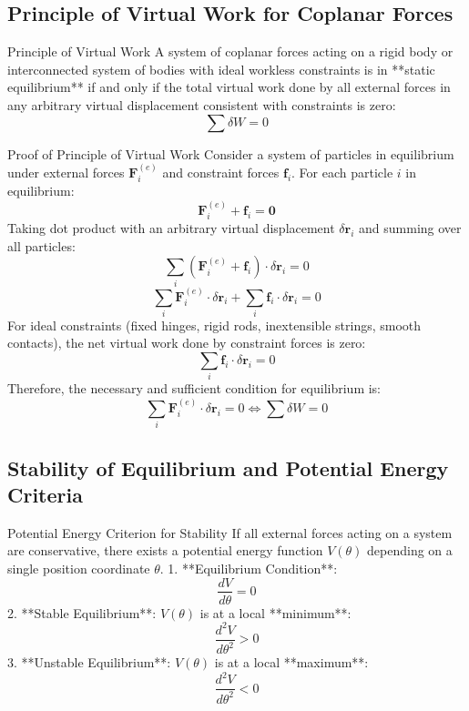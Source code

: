 \documentclass[11pt,a4paper]{article}
\begin{document}
\subsection{Principle of Virtual Work for Coplanar Forces}

\begin{theorembox}{Principle of Virtual Work}
A system of coplanar forces acting on a rigid body or interconnected system of bodies with ideal workless constraints is in **static equilibrium** if and only if the total virtual work done by all external forces in any arbitrary virtual displacement consistent with constraints is zero:
\begin{equation}
\sum \delta W = 0
\end{equation}
\end{theorembox}

\begin{proofbox}{Proof of Principle of Virtual Work}
Consider a system of particles in equilibrium under external forces $\mathbf{F}_i^{(e)}$ and constraint forces $\mathbf{f}_i$.
For each particle $i$ in equilibrium:
\[
\mathbf{F}_i^{(e)} + \mathbf{f}_i = \mathbf{0}
\]
Taking dot product with an arbitrary virtual displacement $\delta \mathbf{r}_i$ and summing over all particles:
\[
\sum_{i} (\mathbf{F}_i^{(e)} + \mathbf{f}_i) \cdot \delta \mathbf{r}_i = 0
\]
\[
\sum_{i} \mathbf{F}_i^{(e)} \cdot \delta \mathbf{r}_i + \sum_{i} \mathbf{f}_i \cdot \delta \mathbf{r}_i = 0
\]
For ideal constraints (fixed hinges, rigid rods, inextensible strings, smooth contacts), the net virtual work done by constraint forces is zero:
\[
\sum_{i} \mathbf{f}_i \cdot \delta \mathbf{r}_i = 0
\]
Therefore, the necessary and sufficient condition for equilibrium is:
\begin{equation}
\sum_{i} \mathbf{F}_i^{(e)} \cdot \delta \mathbf{r}_i = 0 \iff \sum \delta W = 0
\end{equation}
\end{proofbox}

\subsection{Stability of Equilibrium and Potential Energy Criteria}

\begin{definitionbox}{Potential Energy Criterion for Stability}
If all external forces acting on a system are conservative, there exists a potential energy function $V(\theta)$ depending on a single position coordinate $\theta$.
1. **Equilibrium Condition**:
   \begin{equation}
   \frac{dV}{d\theta} = 0
   \end{equation}
2. **Stable Equilibrium**: $V(\theta)$ is at a local **minimum**:
   \begin{equation}
   \frac{d^2 V}{d\theta^2} > 0
   \end{equation}
3. **Unstable Equilibrium**: $V(\theta)$ is at a local **maximum**:
   \begin{equation}
   \frac{d^2 V}{d\theta^2} < 0
   \end{equation}
\end{definitionbox}
\end{document}
